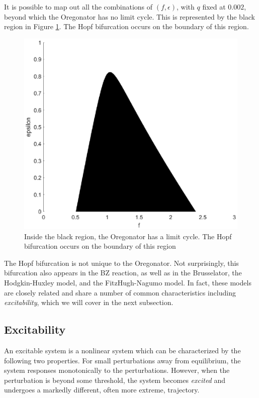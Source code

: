 \documentclass[twocolumn,amsmath,amssymb,aps]{revtex4}
\begin{document}
It is possible to map out all the combinations of $(f,\epsilon)$, with $q$ fixed at $0.002$, beyond which the Oregonator has no limit cycle. This is represented by the black region in Figure \ref{fig:Hopf}. The Hopf bifurcation occurs on the boundary of this region. 
\begin{figure}[!htb]
	\centering
	\includegraphics[scale=0.5]{bifurcation_new.eps}
	\caption{Inside the black region, the Oregonator has a limit cycle. The Hopf bifurcation occurs on the boundary of this region }
	\label{fig:Hopf}
\end{figure}




The Hopf bifurcation is not unique to the Oregonator. Not surprisingly, this bifurcation also appears in the BZ reaction, as well as in the Brusselator, the Hodgkin-Huxley model, and the FitzHugh-Nagumo model. In fact, these models are closely related and share a number of common characteristics including \textit{excitability}, which we will cover in the next subsection.


\subsection{Excitability}
An excitable system is a nonlinear system which can be characterized by the following two properties. For small perturbations away from equilibrium, the system responses monotonically to the perturbations.  However, when the perturbation is beyond some threshold, the system becomes \textit{excited} and undergoes a markedly different, often more extreme, trajectory.  
\end{document}
